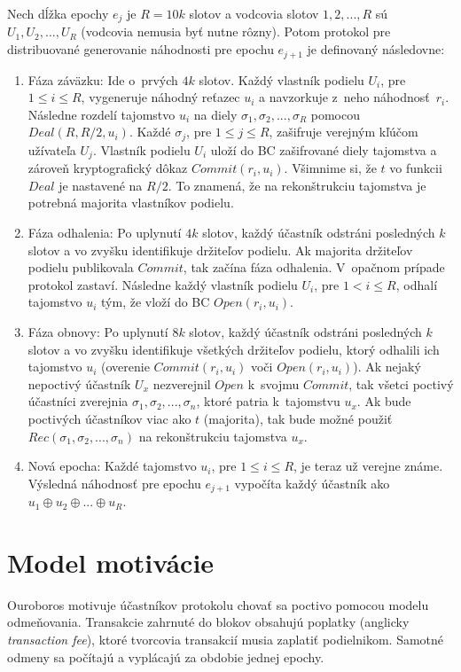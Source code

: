 Nech dĺžka epochy $e_j$ je $R=10k$ slotov a vodcovia slotov $1,2,...,R$ sú $U_1, U_2, ..., U_R$ (vodcovia nemusia byť nutne rôzny). Potom protokol pre distribuované generovanie náhodnosti pre epochu $e_{j+1}$ je definovaný následovne:
\begin{enumerate}
	\item Fáza záväzku: Ide o~prvých $4k$ slotov. Každý vlastník podielu $U_i$, pre $1 \leq i \leq R$, vygeneruje náhodný reťazec $u_i$ a navzorkuje z~neho náhodnosť~$r_i$. Následne rozdelí tajomstvo $u_i$ na diely $\sigma_1, \sigma_2, ..., \sigma_R$ pomocou $Deal(R,R/2,u_i)$. Každé $\sigma_j$, pre $1 \leq j \leq R$, zašifruje verejným kľúčom užívateľa $U_j$. Vlastník podielu $U_i$ uloží do BC zašifrované diely tajomstva a zároveň kryptografický dôkaz $Commit(r_i, u_i)$. Všimnime si, že $t$ vo funkcii $Deal$ je nastavené na $R/2$. To znamená, že na rekonštrukciu tajomstva je potrebná majorita vlastníkov podielu.
	\item Fáza odhalenia: Po uplynutí $4k$ slotov, každý účastník odstráni posledných $k$ slotov a vo zvyšku identifikuje držiteľov podielu. Ak majorita držiteľov podielu publikovala $Commit$, tak začína fáza odhalenia. V~opačnom prípade protokol zastaví. Následne každý vlastník podielu $U_i$, pre $1 < i \leq R$, odhalí tajomstvo $u_i$ tým, že vloží do BC $Open(r_i, u_i)$.
	\item Fáza obnovy: Po uplynutí $8k$ slotov, každý účastník odstráni posledných $k$ slotov a vo zvyšku identifikuje všetkých držiteľov podielu, ktorý odhalili ich tajomstvo $u_i$ (overenie $Commit(r_i, u_i)$ voči $Open(r_i, u_i)$). Ak nejaký nepoctivý účastník $U_x$ nezverejnil $Open$ k~svojmu $Commit$, tak všetci poctivý účastníci zverejnia  $\sigma_1, \sigma_2, ..., \sigma_n$, ktoré patria k~tajomstvu $u_x$. Ak bude poctivých účastníkov viac ako $t$ (majorita), tak bude možné použiť $Rec(\sigma_1, \sigma_2, ..., \sigma_n)$ na rekonštrukciu tajomstva $u_x$.
	\item Nová epocha: Každé tajomstvo $u_i$, pre $1 \leq i \leq R$, je teraz už verejne známe. Výsledná náhodnosť pre epochu $e_{j+1}$ vypočíta každý účastník ako $u_1 \oplus u_2 \oplus ... \oplus u_R$.
\end{enumerate}


\section{Model motivácie}

Ouroboros motivuje účastníkov protokolu chovať sa poctivo pomocou modelu odmeňovania. Transakcie zahrnuté do blokov obsahujú poplatky (anglicky \textit{transaction fee}), ktoré tvorcovia transakcií musia zaplatiť podielnikom. Samotné odmeny sa počítajú a vyplácajú za obdobie jednej epochy.

